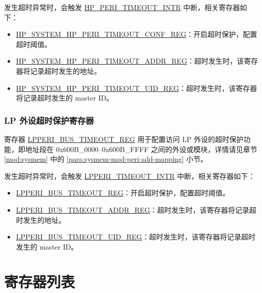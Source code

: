 \documentclass[main\_\_CN.tex]{subfiles}
\begin{document}
发生超时异常时，会触发 \hyperref[tab:peripheral-interrupt-config-status-source]{HP\_PERI\_TIMEOUT\_INTR} 中断，相关寄存器如下：

\begin{itemize}
    \item \hyperref[regdesc:HPSYSTEMHPPERITIMEOUTCONFREG]{HP\_SYSTEM\_HP\_PERI\_TIMEOUT\_CONF\_REG}：开启超时保护，配置超时阈值。
    \item \hyperref[regdesc:HPSYSTEMHPPERITIMEOUTADDRREG]{HP\_SYSTEM\_HP\_PERI\_TIMEOUT\_ADDR\_REG}：超时发生时，该寄存器将记录超时发生的地址。
    \item \hyperref[regdesc:HPSYSTEMHPPERITIMEOUTUIDREG]{HP\_SYSTEM\_HP\_PERI\_TIMEOUT\_UID\_REG}：超时发生时，该寄存器将记录超时发生的 master ID。
\end{itemize}

\subsubsection{LP 外设超时保护寄存器}

寄存器 \hyperref[regdesc:LPPERIBUSTIMEOUTREG]{LPPERI\_BUS\_TIMEOUT\_REG} 用于配置访问 LP 外设的超时保护功能，即地址段在 0x600B\_0000–0x600B\_FFFF 之间的外设或模块，详情请见章节 \ref{mod:sysmem} \textit{} 中的 \ref{para:sysmem-mod-peri-add-mapping} \textit{} 小节。

发生超时异常时，会触发 \hyperref[tab:peripheral-interrupt-config-status-source]{LPPERI\_TIMEOUT\_INTR} 中断，相关寄存器如下：

\begin{itemize}
    \item \hyperref[regdesc:LPPERIBUSTIMEOUTREG]{LPPERI\_BUS\_TIMEOUT\_REG}：开启超时保护，配置超时阈值。
    \item \hyperref[regdesc:LPPERIBUSTIMEOUTADDRREG]{LPPERI\_BUS\_TIMEOUT\_ADDR\_REG}：超时发生时，该寄存器将记录超时发生的地址。
    \item \hyperref[regdesc:LPPERIBUSTIMEOUTUIDREG]{LPPERI\_BUS\_TIMEOUT\_UID\_REG}：超时发生时，该寄存器将记录超时发生的 master  ID。
\end{itemize}



\clearpage
\hypertarget{sysreg-reg-summ}{}
\section{寄存器列表}
\label{sec:sysreg-reg-summ}
\end{document}
